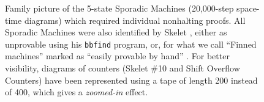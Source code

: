 \begin{figure}[h!]

    \caption{Family picture of the 5-state Sporadic Machines (20,000-step space-time diagrams) which required individual \Coq nonhalting proofs. All Sporadic Machines were also identified by Skelet \cite{Skelet_bbfind}, either as unprovable using his \texttt{bbfind} program, or, for what we call ``Finned machines'' marked as ``easily provable by hand'' \cite{Skelet_bbfind_list}. For better visibility, diagrams of counters (Skelet \#10 and Shift Overflow Counters) have been represented using a tape of length 200 instead of 400, which gives a \textit{zoomed-in} effect.}
    \label{fig:machine_overview}
\end{figure}

